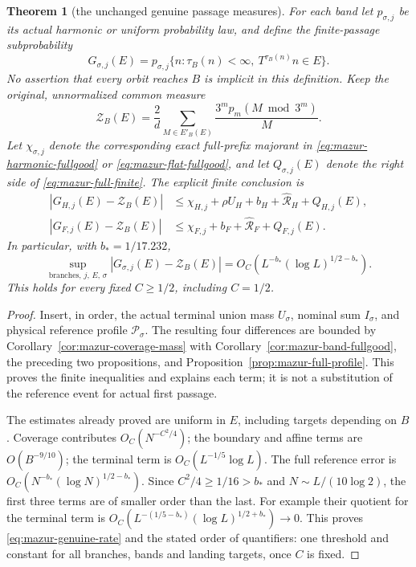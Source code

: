 \documentclass[11pt]{article}
\newtheorem{theorem}[proposition]{Theorem}
\theoremstyle{remark}\newtheorem{remark}[proposition]{Remark}
\begin{document}
\begin{theorem}[the unchanged genuine passage measures]
\label{thm:mazur-genuine-rate}
For each band let $p_{\sigma,j}$ be its actual harmonic or uniform
probability law, and define the finite-passage subprobability
\[
 G_{\sigma,j}(E)=
 p_{\sigma,j}\{n:\tau_B(n)<\infty,\ T^{\tau_B(n)}n\in E\}.
\]
No assertion that every orbit reaches $B$ is implicit in this definition.
Keep the original, unnormalized common measure
\[
 \mathcal Z_B(E)=\frac2d\sum_{M\in E'_B(E)}
                         \frac{3^m p_m(M\bmod3^m)}M.
\]
Let $\chi_{\sigma,j}$ denote the corresponding exact full-prefix
majorant in \eqref{eq:mazur-harmonic-fullgood} or
\eqref{eq:mazur-flat-fullgood}, and let $Q_{\sigma,j}(E)$ denote the
right side of \eqref{eq:mazur-full-finite}. The explicit finite conclusion is
\begin{align}
 |G_{H,j}(E)-\mathcal Z_B(E)|
 &\le\chi_{H,j}+\rho U_H+b_H+
                  \widehat{\mathcal R}_H+Q_{H,j}(E),\nonumber\\
 |G_{F,j}(E)-\mathcal Z_B(E)|
 &\le\chi_{F,j}+b_F+
                  \widehat{\mathcal R}_F+Q_{F,j}(E).
 \label{eq:mazur-genuine-four}
\end{align}
In particular, with $b_*=1/17.232$,
\begin{equation}
 \sup_{\text{branches},\,j,\,E,\,\sigma}
 |G_{\sigma,j}(E)-\mathcal Z_B(E)|
 =O_C\!\left(L^{-b_*}(\log L)^{1/2-b_*}\right).
 \label{eq:mazur-genuine-rate}
\end{equation}
This holds for every fixed $C\ge1/2$, including $C=1/2$.
\end{theorem}
\begin{proof}
Insert, in order, the actual terminal union mass $U_\sigma$, nominal
sum $I_\sigma$, and physical reference profile $\mathcal P_\sigma$.
The resulting four differences are bounded by
Corollary~\ref{cor:mazur-coverage-mass} with
Corollary~\ref{cor:mazur-band-fullgood}, the preceding two propositions,
and Proposition~\ref{prop:mazur-full-profile}. This proves the finite
inequalities and explains each term; it is not a substitution of the
reference event for actual first passage.

The estimates already proved are uniform in $E$, including targets
depending on $B$. Coverage contributes
$O_C(N^{-C^2/4})$; the boundary and affine terms are $O(B^{-9/10})$;
the terminal term is $O_C(L^{-1/5}\log L)$.
The full reference error is
$O_C(N^{-b_*}(\log N)^{1/2-b_*})$.
Since $C^2/4\ge1/16>b_*$ and $N\sim L/(10\log2)$, the first three
terms are of smaller order than the last. For example their quotient
for the terminal term is
$O_C(L^{-(1/5-b_*)}(\log L)^{1/2+b_*})\to0$.
This proves \eqref{eq:mazur-genuine-rate} and the stated order of
quantifiers: one threshold and constant for all branches, bands and
landing targets, once $C$ is fixed.
\end{proof}
\end{document}

